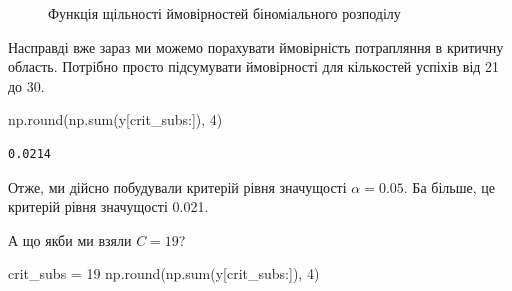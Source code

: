 \documentclass[
  letterpaper,
  10pt,
  openany]{report}
\newenvironment{Shaded}{\begin{snugshade}}{\end{snugshade}}
\newcommand{\BuiltInTok}[1]{\textcolor[rgb]{0.00,0.23,0.31}{#1}}
\newcommand{\DecValTok}[1]{\textcolor[rgb]{0.68,0.00,0.00}{#1}}
\newcommand{\NormalTok}[1]{\textcolor[rgb]{0.00,0.23,0.31}{#1}}
\newcommand{\OperatorTok}[1]{\textcolor[rgb]{0.37,0.37,0.37}{#1}}
\theoremstyle{definition}
\theoremstyle{remark}
\begin{document}
\begin{figure}[H]


\caption{\label{fig-binom-pmf-python}Функція щільності ймовірностей
біноміального розподілу}

\end{figure}%

Насправді вже зараз ми можемо порахувати ймовірність потрапляння в
критичну область. Потрібно просто підсумувати ймовірності для кількостей
успіхів від 21 до 30.

\begin{Shaded}
\begin{Highlighting}[]
\NormalTok{np.}\BuiltInTok{round}\NormalTok{(np.}\BuiltInTok{sum}\NormalTok{(y[crit\_subs:]), }\DecValTok{4}\NormalTok{)}
\end{Highlighting}
\end{Shaded}

\begin{verbatim}
0.0214
\end{verbatim}

Отже, ми дійсно побудували критерій рівня значущості \(\alpha = 0.05\).
Ба більше, це критерій рівня значущості 0.021.

А що якби ми взяли \(C = 19\)?

\begin{Shaded}
\begin{Highlighting}[]
\NormalTok{crit\_subs }\OperatorTok{=} \DecValTok{19}
\NormalTok{np.}\BuiltInTok{round}\NormalTok{(np.}\BuiltInTok{sum}\NormalTok{(y[crit\_subs:]), }\DecValTok{4}\NormalTok{)}
\end{Highlighting}
\end{Shaded}
\end{document}
